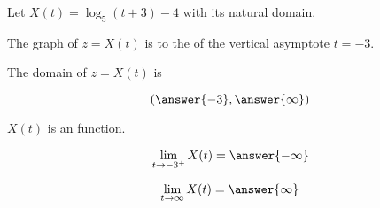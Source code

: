 \documentclass{ximera}
\author{Lee Wayand}
\begin{document}
\begin{exercise}






Let $X(t) = \log_5(t+3) - 4$ with its natural domain. \\





\begin{question}


The graph of $z = X(t)$ is to the  of the vertical asymptote $t = -3$.


\end{question}





\begin{question}


The domain of $z = X(t)$ is 

\[
\left( \answer{-3}, \answer{\infty} \right)
\]


\end{question}






\begin{question}


$X(t)$ is an  function.


\end{question}











\begin{question}


\[
\lim\limits_{t \to -3^+} X(t) = \answer{-\infty}
\]


\end{question}








\begin{question}


\[
\lim\limits_{t \to \infty} X(t) = \answer{\infty}
\]


\end{question}










\end{exercise}
\end{document}
